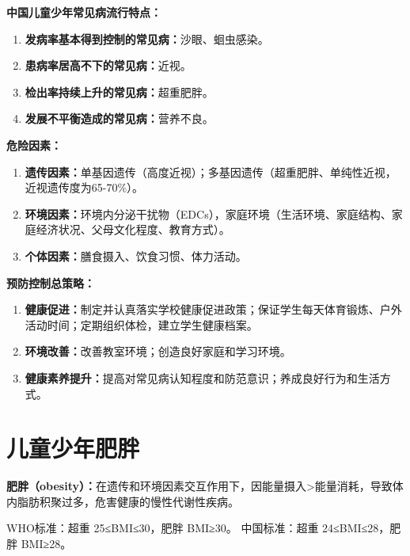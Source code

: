 \begin{keybox}
\textbf{中国儿童少年常见病流行特点：}

\begin{enumerate}[leftmargin=*]
    \item \textbf{发病率基本得到控制的常见病：}沙眼、蛔虫感染。
    \item \textbf{患病率居高不下的常见病：}近视。
    \item \textbf{检出率持续上升的常见病：}超重肥胖。
    \item \textbf{发展不平衡造成的常见病：}营养不良。
\end{enumerate}

\textbf{危险因素：}

\begin{enumerate}[leftmargin=*]
    \item \textbf{遗传因素：}单基因遗传（高度近视）；多基因遗传（超重肥胖、单纯性近视，近视遗传度为65-70\%）。
    \item \textbf{环境因素：}环境内分泌干扰物（EDCs），家庭环境（生活环境、家庭结构、家庭经济状况、父母文化程度、教育方式）。
    \item \textbf{个体因素：}膳食摄入、饮食习惯、体力活动。
\end{enumerate}

\textbf{预防控制总策略：}

\begin{enumerate}[leftmargin=*]
    \item \textbf{健康促进：}制定并认真落实学校健康促进政策；保证学生每天体育锻炼、户外活动时间；定期组织体检，建立学生健康档案。
    \item \textbf{环境改善：}改善教室环境；创造良好家庭和学习环境。
    \item \textbf{健康素养提升：}提高对常见病认知程度和防范意识；养成良好行为和生活方式。
\end{enumerate}
\end{keybox}

\section{儿童少年肥胖}\difficulty

\begin{defbox}
\textbf{肥胖（obesity）：}在遗传和环境因素交互作用下，因能量摄入>能量消耗，导致体内脂肪积聚过多，危害健康的慢性代谢性疾病。

WHO标准：超重 25≤BMI≤30，肥胖 BMI≥30。
中国标准：超重 24≤BMI≤28，肥胖 BMI≥28。
\end{defbox}

